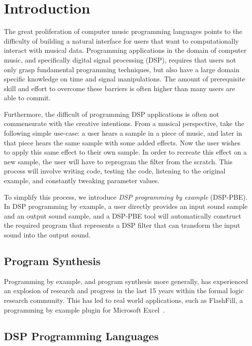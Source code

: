\section{Introduction}

The great proliferation of computer music programming languages points to the difficulty of building a natural interface for users that want to computationally interact with musical data.
Programming applications in the domain of computer music, and specifically digital signal processing (DSP), requires that users not only grasp fundamental programming techniques, but also have a large domain specific knowledge on time and signal manipulations.
The amount of prerequisite skill and effort to overcome these barriers is often higher than many users are able to commit.

Furthermore, the difficult of programming DSP applications is often not commensurate with the creative intentions.
From a musical perspective, take the following simple use-case: a user hears a sample in a piece of music, and later in that piece hears the same sample with some added effects.
Now the user wishes to apply this same effect to their own sample.
In order to recreate this effect on a new sample, the user will have to reprogram the filter from the scratch.
This process will involve writing code, testing the code, listening to the original example, and constantly tweaking parameter values.

To simplify this process, we introduce \textit{DSP programming by example} (DSP-PBE).
In DSP programming by example, a user directly provides an input sound sample and an output sound sample, and a DSP-PBE tool will automatically construct the required program that represents a DSP filter that can transform the input sound into the output sound.

\subsection{Program Synthesis}
Programming by example, and program synthesis more generally, has experienced an explosion of research and progress in the last 15 years within the formal logic research community.
This has led to real world applications, such as FlashFill, a programming by example plugin for Microsoft Excel~\cite{Gulwani2011}.

\subsection{DSP Programming Languages}

